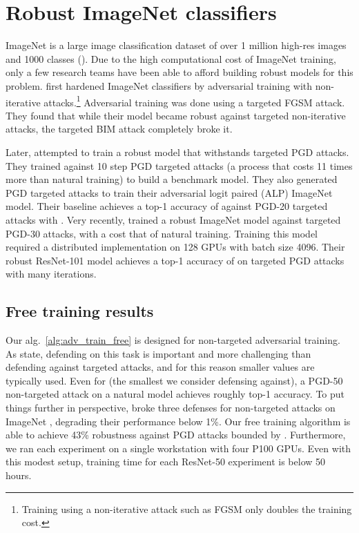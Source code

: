 \documentclass{article}
\begin{document}
\section{Robust ImageNet classifiers}
ImageNet is a large image classification dataset of over 1 million high-res images and 1000 classes (\cite{russakovsky2015imagenet}). Due to the high computational cost of ImageNet training, only a few research teams have been able to afford building robust models for this problem. \cite{kurakin2016adversarial} first hardened ImageNet classifiers by adversarial training with non-iterative attacks.\footnote{Training using a non-iterative attack such as FGSM only doubles the training cost. }
Adversarial training was done using a targeted FGSM attack. 
 They found that while their model became robust against targeted non-iterative attacks, the targeted BIM attack completely broke it. 

Later, \cite{kannan2018adversarial} attempted to train a robust model that withstands targeted PGD attacks. They trained against 10 step PGD targeted attacks (a process that costs 11 times more than natural training) to build a benchmark model. They also generated PGD targeted attacks to train their adversarial logit paired (ALP) ImageNet model. Their baseline achieves a top-1 accuracy of  against PGD-20 targeted attacks with . 
Very recently, \cite{xie2018feature} trained a robust ImageNet model against targeted PGD-30 attacks, with a cost  that of natural training.  Training this model required a distributed implementation on 128 GPUs with batch size 4096.
Their robust ResNet-101 model achieves a top-1 accuracy of  on targeted PGD attacks with many iterations.

\subsection*{Free training results}
Our alg.~\ref{alg:adv_train_free} is designed for non-targeted adversarial training. As \cite{athalye2018obfuscated} state, defending on this task is important and more challenging than defending against targeted attacks, and for this reason smaller  values are typically used.
Even for  (the smallest  we consider defensing against), a PGD-50 non-targeted attack on a natural model achieves roughly  top-1 accuracy. To put things further in perspective, \cite{uesato2018adversarial} broke three defenses for  non-targeted attacks on ImageNet \citep{guo2017countering, liao2018defense, xie2017mitigating}, degrading their performance below 1\%. 
Our free training algorithm is able to achieve 43\% robustness against PGD attacks bounded by . Furthermore, we ran each experiment on a single workstation with four P100 GPUs.  Even with this modest setup, training time for each ResNet-50 experiment is below 50 hours.  
\end{document}
